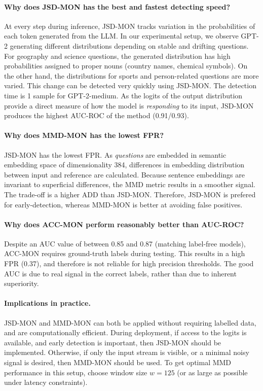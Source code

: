 \documentclass[12pt,a4paper]{article}
\begin{document}
\paragraph{Why does \textsc{JSD-MON} has the best and fastest detecting speed?}
At every step during inference, JSD-MON tracks variation in the probabilities of each token generated from the LLM. In our experimental setup, we observe GPT-2 generating different distributions depending on stable and drifting questions. For geography and science questions, the generated distribution has high probabilities assigned to proper nouns (country names, chemical symbols). On the other hand, the distributions for sports and person-related questions are more varied. This change can be detected very quickly using JSD-MON. The detection time is 1 sample for GPT-2-medium. As the logits of the output distribution provide a direct measure of how the model is \emph{responding} to its input, JSD-MON produces the highest AUC-ROC of the method (0.91/0.93).



\paragraph{Why does \textsc{MMD-MON} has the lowest FPR?}
JSD-MON has the lowest FPR. As \emph{questions} are embedded in semantic embedding space of dimensionality 384, differences in embedding distribution between input and reference are calculated. Because sentence embeddings are invariant to superficial differences, the MMD metric results in a smoother signal. The trade-off is a higher ADD than JSD-MON. Therefore, JSD-MON is prefered for early-detection, whereas MMD-MON is better at avoiding false positives.




\paragraph{ Why does ACC-MON perform reasonably better than AUC-ROC? }
Despite an AUC value of between 0.85 and 0.87 (matching label-free models), ACC-MON requires ground-truth labels during testing. This results in a high FPR (0.37), and therefore is not reliable for high precision thresholds. The good AUC is due to real signal in the correct labels, rather than due to inherent superiority.

\paragraph{Implications in practice.}
JSD-MON and MMD-MON can both be applied without requiring labelled data, and are computationally efficient. During deployment, if access to the logits is available, and early detection is important, then JSD-MON should be implemented. Otherwise, if only the input stream is visible, or a minimal noisy signal is desired, then MMD-MON should be used. To get optimal MMD performance in this setup, choose window size $w\!=\!125$ (or as large as possible under latency constraints).
\end{document}
